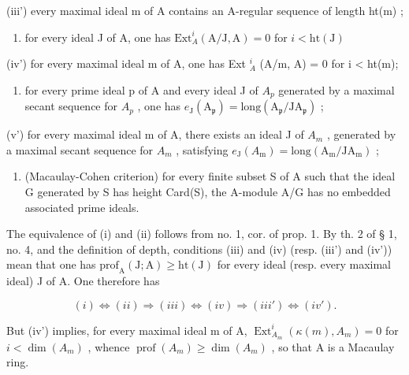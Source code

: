(iii') every maximal ideal m of A contains an A-regular sequence of length ht(m) ;

\begin{enumerate}
\def\labelenumi{(\roman{enumi})}
\setcounter{enumi}{3}
\tightlist
\item
  for every ideal J of A, one has \(\mathrm{Ext}_A^i (\mathrm{A} / \mathrm{J},\mathrm{A}) = 0\) for \(i <   \mathrm{ht}(\mathrm{J})\)
\end{enumerate}

(iv') for every maximal ideal m of A, one has Ext \(_{A}^{i}\) (A/m, A) = 0 for i \textless{} ht(m);

\begin{enumerate}
\def\labelenumi{(\alph{enumi})}
\setcounter{enumi}{21}
\tightlist
\item
  for every prime ideal p of A and every ideal J of \(A_{p}\) generated by a maximal secant sequence for \(A_{p}\) , one has \(e_{\mathrm{J}}(\mathrm{A}_{\mathfrak{p}})=\mathrm{long}(\mathrm{A}_{\mathfrak{p}}/\mathrm{JA}_{\mathfrak{p}})\) ;
\end{enumerate}

(v') for every maximal ideal m of A, there exists an ideal J of \(A_{m}\) , generated by a maximal secant sequence for \(A_{m}\) , satisfying \(e_{\mathrm{J}}(A_{\mathrm{m}})=\mathrm{long}(\mathrm{A}_{\mathrm{m}}/\mathrm{JA}_{\mathrm{m}})\) ;

\begin{enumerate}
\def\labelenumi{(\roman{enumi})}
\setcounter{enumi}{5}
\tightlist
\item
  (Macaulay-Cohen criterion) for every finite subset S of A such that the ideal G generated by S has height Card(S), the A-module A/G has no embedded associated prime ideals.
\end{enumerate}

The equivalence of (i) and (ii) follows from no. 1, cor. of prop. 1. By th. 2 of § 1, no. 4, and the definition of depth, conditions (iii) and (iv) (resp. (iii') and (iv')) mean that one has \(\mathrm{prof}_{\mathrm{A}}(\mathrm{J};\mathrm{A})\geqslant \mathrm{ht}(\mathrm{J})\) for every ideal (resp. every maximal ideal) J of A. One therefore has

\[
(i) \Leftrightarrow (ii) \Rightarrow (iii) \Leftrightarrow (iv) \Rightarrow (iii') \Leftrightarrow (iv').
\]

But (iv') implies, for every maximal ideal m of A, \(\operatorname{Ext}_{A_{m}}^{i}(\kappa(m), A_{m}) = 0\) for \(i < \dim(A_{m})\) , whence \(\operatorname{prof}(A_{m}) \geqslant \dim(A_{m})\) , so that A is a Macaulay ring.

